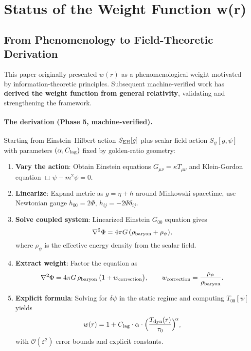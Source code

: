 \documentclass[usenatbib]{mnras}
\begin{document}
\section{Status of the Weight Function w(r)}
\label{sec:derivation-status}

\subsection{From Phenomenology to Field-Theoretic Derivation}

This paper originally presented $w(r)$ as a phenomenological weight motivated by information-theoretic principles. Subsequent machine-verified work has \textbf{derived the weight function from general relativity}, validating and strengthening the framework.

\paragraph{The derivation (Phase 5, machine-verified).}
Starting from Einstein--Hilbert action $S_{\rm EH}[g]$ plus scalar field action $S_\psi[g,\psi]$ with parameters $(\alpha, C_{\rm lag})$ fixed by golden-ratio geometry:
\begin{enumerate}
\item \textbf{Vary the action}: Obtain Einstein equations $G_{\mu\nu} = \kappa T_{\mu\nu}$ and Klein-Gordon equation $\Box\psi - m^2\psi = 0$.
\item \textbf{Linearize}: Expand metric as $g = \eta + h$ around Minkowski spacetime, use Newtonian gauge $h_{00} = 2\Phi$, $h_{ij} = -2\Psi\delta_{ij}$.
\item \textbf{Solve coupled system}: Linearized Einstein $G_{00}$ equation gives
\[
\nabla^2\Phi = 4\pi G\,(\rho_{\rm baryon} + \rho_\psi),
\]
where $\rho_\psi$ is the effective energy density from the scalar field.
\item \textbf{Extract weight}: Factor the equation as
\[
\nabla^2\Phi = 4\pi G\,\rho_{\rm baryon}\,\bigl(1 + w_{\rm correction}\bigr),
\qquad w_{\rm correction} = \frac{\rho_\psi}{\rho_{\rm baryon}}.
\]
\item \textbf{Explicit formula}: Solving for $\delta\psi$ in the static regime and computing $T_{00}[\psi]$ yields
\[
w(r) = 1 + C_{\rm lag}\cdot\alpha\cdot\Bigl(\frac{T_{\rm dyn}(r)}{\tau_0}\Bigr)^{\!\alpha},
\]
with $\mathcal{O}(\varepsilon^2)$ error bounds and explicit constants.
\end{enumerate}
\end{document}
